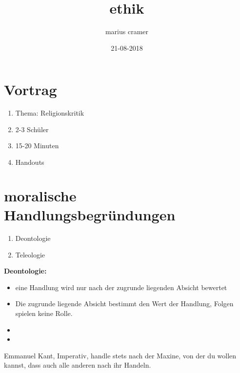 \documentclass{article}
\title{ethik}
\author{marius cramer}
\date{21-08-2018}
\begin{document}
\maketitle

\section{Vortrag}
\begin{enumerate}
  \item Thema: Religionskritik
  \item 2-3 Schüler
  \item 15-20 Minuten
  \item Handouts
\end{enumerate}

\section{moralische Handlungsbegründungen}
\begin{enumerate}
  \item Deontologie
  \item Teleologie
\end{enumerate}
\textbf{Deontologie:}
\begin{itemize}
  \item eine Handlung wird nur nach der zugrunde liegenden Absicht bewertet
  \item Die zugrunde liegende Absicht bestimmt den Wert der Handlung, Folgen spielen keine Rolle.
\end{itemize}

\bigskip

\begin{itemize}
  \item
  \item
\end{itemize}

\bigskip

Emmanuel Kant, Imperativ, handle stets nach der Maxine, von der du wollen kannst, dass auch alle anderen nach ihr Handeln.
\end{document}
